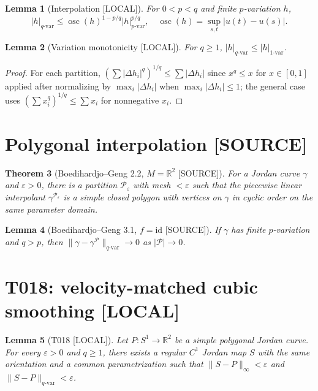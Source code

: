\documentclass[11pt]{article}
\newtheorem{theorem}{Theorem}[section]
\newtheorem{lemma}[theorem]{Lemma}
\theoremstyle{definition}
\theoremstyle{remark}
\newcommand{\tagsource}{\textsf{\footnotesize[SOURCE]}}
\newcommand{\taglocal}{\textsf{\footnotesize[LOCAL]}}
\begin{document}
\begin{lemma}[Interpolation \taglocal]\label{lem:interp}
For $0<p<q$ and finite $p$-variation $h$,
\[
|h|_{q\text{-var}}\le \operatorname{osc}(h)^{1-p/q}|h|_{p\text{-var}}^{p/q},
\quad \operatorname{osc}(h)=\sup_{s,t}|u(t)-u(s)|.
\]
\end{lemma}

\begin{lemma}[Variation monotonicity \taglocal]\label{lem:qle1}
For $q\ge 1$, $|h|_{q\text{-var}}\le |h|_{1\text{-var}}$.
\end{lemma}

\begin{proof}
For each partition, $(\sum|\Delta h_i|^q)^{1/q}\le\sum|\Delta h_i|$ since
$x^q\le x$ for $x\in[0,1]$ applied after normalizing by $\max_i|\Delta h_i|$
when $\max_i|\Delta h_i|\le 1$; the general case uses
$(\sum x_i^q)^{1/q}\le\sum x_i$ for nonnegative $x_i$.
\end{proof}

\section{Polygonal interpolation \tagsource}

\begin{theorem}[Boedihardjo--Geng 2.2, $M=\mathbb{R}^2$ \tagsource]
For a Jordan curve $\gamma$ and $\varepsilon>0$, there is a partition
$\mathcal{P}_\varepsilon$ with mesh $<\varepsilon$ such that the piecewise
linear interpolant $\gamma^{\mathcal{P}_\varepsilon}$ is a simple closed polygon
with vertices on $\gamma$ in cyclic order on the same parameter domain.
\end{theorem}

\begin{lemma}[Boedihardjo--Geng 3.1, $f=\mathrm{id}$ \tagsource]
If $\gamma$ has finite $p$-variation and $q>p$, then
$\|\gamma-\gamma^{\mathcal{P}}\|_{q\text{-var}}\to 0$ as $|\mathcal{P}|\to 0$.
\end{lemma}

\section{T018: velocity-matched cubic smoothing \taglocal}

\begin{lemma}[T018 \taglocal]\label{lem:T018}
Let $P:S^1\to\mathbb{R}^2$ be a simple polygonal Jordan curve.
For every $\varepsilon>0$ and $q\ge 1$, there exists a regular $C^1$ Jordan
map $S$ with the same orientation and a common parametrization such that
$\|S-P\|_\infty<\varepsilon$ and $\|S-P\|_{q\text{-var}}<\varepsilon$.
\end{lemma}
\end{document}
